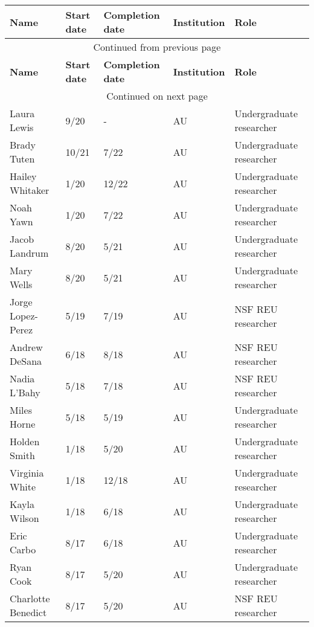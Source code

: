 {\sffamily\small
{}
\begin{longtable}[l]{ p{1.2in} p{0.5in} p{0.8in}p{0.75in} p{2in} }
    \hline
    \textbf{Name} & \textbf{Start date} & \textbf{Completion date} & \textbf{Institution} & \textbf{Role} \\
    \hline
    \endfirsthead
    \multicolumn{5}{c}{{Continued from previous page}} \\
    \hline
    \textbf{Name} & \textbf{Start date} & \textbf{Completion date} & \textbf{Institution} & \textbf{Role} \\
    \hline
    \endhead
    \hline \multicolumn{5}{c}{{Continued on next page}} \\
    \endfoot
    \hline
    \endlastfoot
    Laura Lewis & 9/20 & - & AU & Undergraduate researcher \\
    Brady Tuten & 10/21 & 7/22 & AU & Undergraduate researcher \\
    Hailey Whitaker & 1/20 & 12/22 & AU & Undergraduate researcher \\
    Noah Yawn & 1/20 & 7/22 & AU & Undergraduate researcher \\
    Jacob Landrum & 8/20 & 5/21 & AU & Undergraduate researcher \\
    Mary Wells & 8/20 & 5/21 & AU & Undergraduate researcher \\
    Jorge Lopez-Perez & 5/19 & 7/19 & AU & NSF REU researcher \\
    Andrew DeSana & 6/18 & 8/18 & AU & NSF REU researcher \\
    Nadia L'Bahy & 5/18 & 7/18 & AU & NSF REU researcher \\
    Miles Horne & 5/18 & 5/19 & AU & Undergraduate researcher \\
    Holden Smith & 1/18 & 5/20 & AU & Undergraduate researcher \\
    Virginia White & 1/18 & 12/18 & AU & Undergraduate researcher \\
    Kayla Wilson & 1/18 & 6/18 & AU & Undergraduate researcher \\
    Eric Carbo & 8/17 & 6/18 & AU & Undergraduate researcher \\
    Ryan Cook & 8/17 & 5/20 & AU & Undergraduate researcher \\
    Charlotte Benedict & 8/17 & 5/20 & AU & NSF REU researcher \\
\end{longtable}
}
